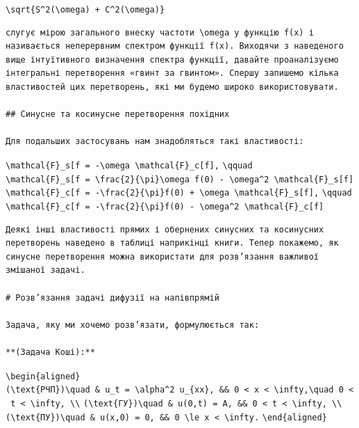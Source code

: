 \documentclass[
  ukrainian,
]{article}
\begin{document}
\texttt{\textbackslash{}sqrt\{S\^{}2(\textbackslash{}omega)\ +\ C\^{}2(\textbackslash{}omega)\}}

\begin{verbatim}
слугує мірою загального внеску частоти \omega у функцію f(x) і називається неперервним спектром функції f(x). Виходячи з наведеного вище інтуїтивного визначення спектра функції, давайте проаналізуємо інтегральні перетворення «гвинт за гвинтом». Спершу запишемо кілька властивостей цих перетворень, які ми будемо широко використовувати.

## Синусне та косинусне перетворення похідних

Для подальших застосувань нам знадобляться такі властивості:
\end{verbatim}

\texttt{\textbackslash{}mathcal\{F\}\_s{[}f\textquotesingle{}{]}\ =\ -\textbackslash{}omega\ \textbackslash{}mathcal\{F\}\_c{[}f{]},}
\texttt{\textbackslash{}qquad}
\texttt{\textbackslash{}mathcal\{F\}\_s{[}f\textquotesingle{}\textquotesingle{}{]}\ =\ \textbackslash{}frac\{2\}\{\textbackslash{}pi\}\textbackslash{}omega\ f(0)\ -\ \textbackslash{}omega\^{}2\ \textbackslash{}mathcal\{F\}\_s{[}f{]}}
\texttt{\textbackslash{}mathcal\{F\}\_c{[}f\textquotesingle{}{]}\ =\ -\textbackslash{}frac\{2\}\{\textbackslash{}pi\}f(0)\ +\ \textbackslash{}omega\ \textbackslash{}mathcal\{F\}\_s{[}f{]},}
\texttt{\textbackslash{}qquad}
\texttt{\textbackslash{}mathcal\{F\}\_c{[}f\textquotesingle{}\textquotesingle{}{]}\ =\ -\textbackslash{}frac\{2\}\{\textbackslash{}pi\}f\textquotesingle{}(0)\ -\ \textbackslash{}omega\^{}2\ \textbackslash{}mathcal\{F\}\_c{[}f{]}}

\begin{verbatim}
Деякі інші властивості прямих і обернених синусних та косинусних перетворень наведено в таблиці наприкінці книги. Тепер покажемо, як синусне перетворення можна використати для розв’язання важливої змішаної задачі.

# Розв’язання задачі дифузії на напівпрямій

Задача, яку ми хочемо розв’язати, формулюється так:

**(Задача Коші):**
\end{verbatim}

\texttt{\textbackslash{}begin\{aligned\}}
\texttt{(\textbackslash{}text\{РЧП\})\textbackslash{}quad\ \&\ u\_t\ =\ \textbackslash{}alpha\^{}2\ u\_\{xx\},\ \&\&\ 0\ \textless{}\ x\ \textless{}\ \textbackslash{}infty,\textbackslash{}quad\ 0\ \textless{}\ t\ \textless{}\ \textbackslash{}infty,\ \textbackslash{}\textbackslash{}}
\texttt{(\textbackslash{}text\{ГУ\})\textbackslash{}quad\ \&\ u(0,t)\ =\ A,\ \&\&\ 0\ \textless{}\ t\ \textless{}\ \textbackslash{}infty,\ \textbackslash{}\textbackslash{}}
\texttt{(\textbackslash{}text\{ПУ\})\textbackslash{}quad\ \&\ u(x,0)\ =\ 0,\ \&\&\ 0\ \textbackslash{}le\ x\ \textless{}\ \textbackslash{}infty.}
\texttt{\textbackslash{}end\{aligned\}}
\end{document}
